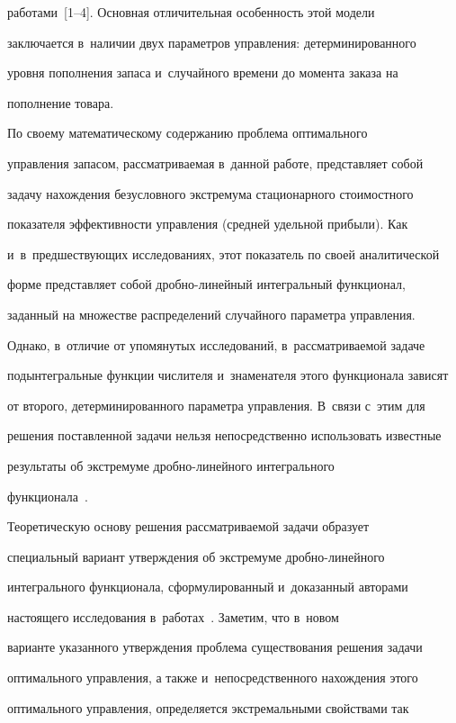 работами~[1--4]. Основная отличительная особенность этой модели 

заключается в~наличии двух параметров управления: детерминированного 

уровня пополнения запаса и~случайного времени до момента заказа на 

пополнение товара. 

  

  По своему математическому содержанию проблема оптимального 

управления запасом, рассматриваемая в~данной работе, представляет собой 

задачу нахождения безусловного экстремума стационарного стоимостного 

показателя эффективности управления (средней удельной прибыли). Как 

и~в~предшеству\-ющих исследованиях, этот показатель по своей аналитической 

форме представляет собой дроб\-но-ли\-ней\-ный интегральный функционал, 

заданный на множестве распределений случайного параметра управления. 

Однако, в~отличие от упомянутых исследований, в~рассматриваемой задаче 

подынтегральные функции числителя и~знаменателя этого функционала зависят 

от второго, детерминированного параметра управления. В~связи с~этим для 

решения поставленной задачи нельзя непосредственно использовать известные 

результаты об экстремуме дроб\-но-ли\-ней\-но\-го интегрального 

функционала~\cite{10-sh, 11-sh}.

  

  Теоретическую основу решения рассматриваемой задачи образует 

специальный вариант утверждения об экстремуме дробно-линейного 

интегрального функционала, сформулированный и~доказанный авторами 

настоящего исследования в~работах~\cite{12-sh, 13-sh}. Заметим, что в~новом 

варианте указанного утверждения проблема существования решения задачи 

оптимального управления, а также и~непосредственного нахождения этого 

оптимального управления, определяется экстремальными свойствами так 

